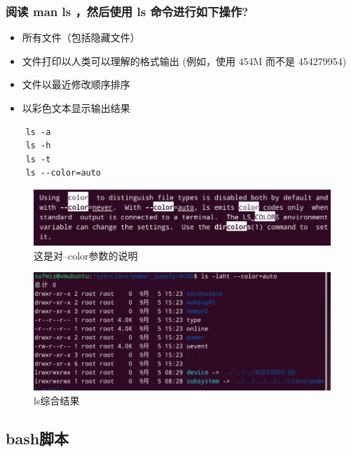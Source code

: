 \documentclass[UTF8]{ctexart}
\begin{document}
\subsubsection{阅读 man ls ，然后使用 ls 命令进行如下操作?}
\begin{itemize}
	\item 所有文件（包括隐藏文件）
	\item 文件打印以人类可以理解的格式输出 (例如，使用 454M 而不是 454279954)
	\item 文件以最近修改顺序排序
	\item 以彩色文本显示输出结果
\end{itemize}
\begin{lstlisting}
	ls -a
	ls -h 
	ls -t
	ls --color=auto
\end{lstlisting}
\begin{figure}[H]
	\centering
	\includegraphics[width=0.7\linewidth]{figures/color.png}
	\caption{这是对--color参数的说明}
\end{figure}
\begin{figure}[H]
	\centering
	\includegraphics[width=0.7\linewidth]{figures/ls.png}
	\caption{ls综合结果}
\end{figure}

\subsection{bash脚本}
\end{document}
